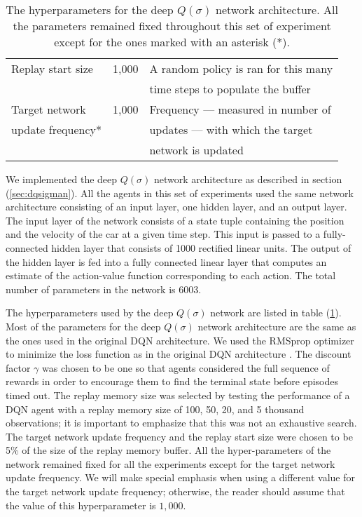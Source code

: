 \begin{table}[t]
\begin{tabular}{l|c|l}
        Replay start size               & 1,000     & A random policy is ran for this many \\
                                        &           & time steps to populate the buffer 
        \\ \hdashline[3pt/3pt]
        Target network                  & 1,000     & Frequency --- measured in number of  \\
        update frequency*               &           & updates --- with which the target    \\
                                        &           & network is updated                    
        \\ \bottomrule
    \end{tabular}
    \caption[Hyperparameters for the Deep $Q(\sigma)$ Network Architecture]{The hyperparameters for the deep $Q(\sigma)$ network architecture.
    All the parameters remained fixed throughout this set of experiment except for the ones marked with an asterisk (*).
    }
    \label{tab:dqsigman_parameters}
\end{table}

We implemented the deep $Q(\sigma)$ network architecture as described in section (\ref{sec:dqsigman}).
All the agents in this set of experiments used the same network architecture consisting of an input layer, one hidden layer, and an output layer.
The input layer of the network consists of a state tuple containing the position and the velocity of the car at a given time step.
This input is passed to a fully-connected hidden layer that consists of 1000 rectified linear units.
The output of the hidden layer is fed into a fully connected linear layer that computes an estimate of the action-value function corresponding to each action.
The total number of parameters in the network is 6003.

The hyperparameters used by the deep $Q(\sigma)$ network are listed in table (\ref{tab:dqsigman_parameters}).
Most of the parameters for the deep $Q(\sigma)$ network architecture are the same as the ones used in the original DQN architecture.
We used the RMSprop optimizer to minimize the loss function as in the original DQN architecture \parencite{Tieleman2012, mnih2015humanlevel}.
The discount factor $\gamma$ was chosen to be one so that agents considered the full sequence of rewards in order to encourage them to find the terminal state before episodes timed out.
The replay memory size was selected by testing the performance of a DQN agent with a replay memory size of 100, 50, 20, and 5 thousand observations; it is important to emphasize that this was not an exhaustive search.
The target network update frequency and the replay start size were chosen to be 5\% of the size of the replay memory buffer.
All the hyper-parameters of the network remained fixed for all the experiments except for the target network update frequency.
We will make special emphasis when using a different value for the target network update frequency; otherwise, the reader should assume that the value of this hyperparameter is $1,000$.

